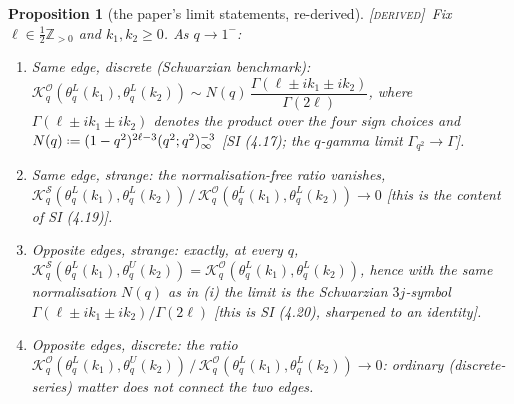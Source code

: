 \documentclass[11pt,a4paper]{article}
\providecommand{\coloneqq}{\mathrel{\vcenter{\baselineskip0.5ex \lineskiplimit0pt
      \hbox{\scriptsize.}\hbox{\scriptsize.}}}=}
\newcommand{\DERIVED}{{\color{teal}\textsc{[derived]}}}
\theoremstyle{definition}
\theoremstyle{plain}
\newtheorem{proposition}[definition]{Proposition}
\newcommand{\Z}{\mathbb{Z}}
\renewcommand{\O}{\mathcal{O}}                  %
\newcommand{\K}{\mathcal{K}}                    %
\begin{document}
\begin{proposition}[the paper's limit statements, re-derived]\label{prop:limits}
\DERIVED\ Fix $\ell\in\tfrac12\Z_{>0}$ and $k_{1},k_{2}\ge0$. As $q\to1^{-}$:
\begin{enumerate}[label=(\roman*)]
\item \emph{Same edge, discrete (Schwarzian benchmark):}
$\K^{\O}_{q}(\theta^{L}_{q}(k_1),\theta^{L}_{q}(k_2))
\sim N(q)\,\dfrac{\Gamma(\ell\pm ik_1\pm ik_2)}{\Gamma(2\ell)}$,
where $\Gamma(\ell\pm ik_1\pm ik_2)$ denotes the product over the four sign choices and
$N(q)\coloneqq(1-q^{2})^{2\ell-3}(q^{2};q^{2})_{\infty}^{-3}$
[SI (4.17); the $q$-gamma limit $\Gamma_{q^2}\to\Gamma$].
\item \emph{Same edge, strange:} the normalisation-free ratio vanishes,
$\K^{\mathcal{S}}_{q}(\theta^{L}_{q}(k_1),\theta^{L}_{q}(k_2))\,/\,
 \K^{\O}_{q}(\theta^{L}_{q}(k_1),\theta^{L}_{q}(k_2))\longrightarrow 0$
[this is the content of SI (4.19)].
\item \emph{Opposite edges, strange:} exactly, at every $q$,
$\K^{\mathcal{S}}_{q}(\theta^{L}_{q}(k_1),\theta^{U}_{q}(k_2))
=\K^{\O}_{q}(\theta^{L}_{q}(k_1),\theta^{L}_{q}(k_2))$,
hence with the same normalisation $N(q)$ as in (i) the limit is the Schwarzian $3j$-symbol
$\Gamma(\ell\pm ik_1\pm ik_2)/\Gamma(2\ell)$ [this is SI (4.20), sharpened to an identity].
\item \emph{Opposite edges, discrete:} the ratio
$\K^{\O}_{q}(\theta^{L}_{q}(k_1),\theta^{U}_{q}(k_2))\,/\,
 \K^{\O}_{q}(\theta^{L}_{q}(k_1),\theta^{L}_{q}(k_2))\longrightarrow 0$:
ordinary (discrete-series) matter does \emph{not} connect the two edges.
\end{enumerate}
\end{proposition}
\end{document}
